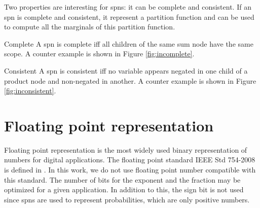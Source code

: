 Two properties are interesting for \glspl{spn}: it can be complete and consistent. If an \gls{spn} is complete and consistent, it represent a partition function and can be used to compute all the marginals of this partition function.

\begin{definition}{Complete}
A \gls{spn} is complete iff all children of the same sum node have the same scope. A counter example is shown in Figure \ref{fig:incomplete}.
\end{definition}

\begin{definition}{Consistent}
A \gls{spn} is consistent iff no variable appears negated in one child of a product node and non-negated in another. A counter example is shown in Figure \ref{fig:inconsistent}.
\end{definition}

\begin{figure}[!ht]
\begin{mdframed}
	\centering
	\subfloat[incomplete]{ \label{fig:incomplete}}
	\subfloat[inconsistent]{ \label{fig:inconsistent}}
\end{mdframed}
\end{figure}



\section{Floating point representation}
Floating point representation is the most widely used binary representation of numbers for digital applications. The floating point standard IEEE Std 754-2008 is defined in \cite{float_std}. In this work, we do not use floating point number compatible with this standard. The number of bits for the exponent and the fraction may be optimized for a given application. In addition to this, the sign bit is not used since \glspl{spn} are used to represent probabilities, which are only positive numbers.

